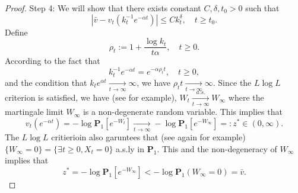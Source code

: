 \documentclass[12pt,a4paper]{amsart}
\theoremstyle{plain}
\theoremstyle{definition}
\numberwithin{equation}{section}
\begin{document}
\begin{proof}
    Step 4: We will show that there exists constant $C, \delta,t_0>0$ such that
\[
    |\bar v - v_t(k_t^{-1} e^{-\alpha t})|\leq Ck_t^\delta, \quad t\geq t_0.
\]
    Define
\[
    \rho_t := 1+ \frac{\log k_t}{t\alpha}, \quad t\geq 0.
\]
    According to the fact that
\[
    k_t^{-1}e^{-\alpha t} = e^{-\alpha \rho_t t}, \quad t\geq 0,
\]
    and the condition that $k_t e^{\alpha t} \xrightarrow[t\to \infty]{} \infty$, we have $\rho_t t \xrightarrow[t\to \infty]{} \infty $.
    Since the $L\log L$ criterion is satisfied, we have (see \cite{LiuRenSong2009Llog} for example), $W_t \xrightarrow[t\to \infty]{a.s.} W_\infty$ where the martingale limit $W_\infty$ is a non-degenerate random variable. This implies that
\[
    v_t(e^{-\alpha t}) = -\log \mathbf P_1[e^{-W_t}]\xrightarrow[t\to \infty]{} - \log \mathbf P_{1}[e^{-W_\infty}] =: z^* \in (0,\infty).
\]
    The $L \log L$ critierioin also garuntees that (see again \cite{LiuRenSong2009Llog} for example) $\{W_\infty = 0\} = \{\exists t \geq 0, X_t= 0\}$  a.s.ly in $\mathbf P_1$. This and the non-degeneracy of $W_\infty$ implies that
\[
    z^*=-\log \mathbf P_1[e^{-W_\infty}] < -\log \mathbf P_1(W_\infty = 0) = \bar v.
\]


\end{proof}
\end{document}
